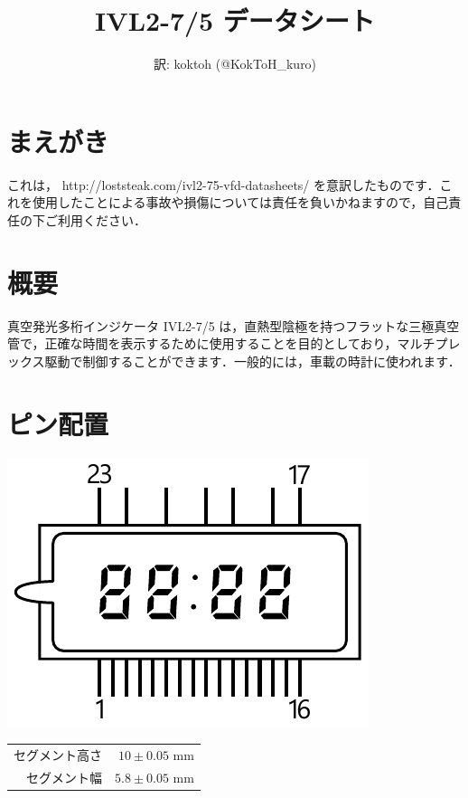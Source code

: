 \documentclass[12pt]{jarticle}
\title{IVL2-7/5 データシート}
\author{訳: koktoh (@KokToH\_kuro)}
\date{}
\begin{document}
\maketitle

\section*{まえがき}

これは， http://loststeak.com/ivl2-75-vfd-datasheets/ を意訳したものです．これを使用したことによる事故や損傷については責任を負いかねますので，自己責任の下ご利用ください．

\section{概要}

真空発光多桁インジケータ IVL2-7/5 は，直熱型陰極を持つフラットな三極真空管で，正確な時間を表示するために使用することを目的としており，マルチプレックス駆動で制御することができます．一般的には，車載の時計に使われます．

\section{ピン配置}

    
\begin{minipage}{0.6\linewidth}
    \centering
    \includegraphics[width=\linewidth]{../img/IVL275.pdf}
\end{minipage}
\hfill
\begin{minipage}[b]{0.35\linewidth}
    \begin{tabular}{rr}
        セグメント高さ & \(10\pm0.05\)  mm \\
        セグメント幅   & \(5.8\pm0.05\) mm
    \end{tabular}
\end{minipage}
\end{document}
